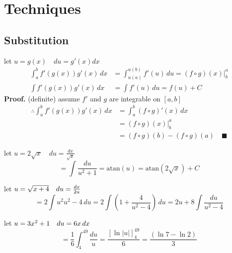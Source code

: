 \section{Techniques}
    \subsection{Substitution}
	    \begin{theorem}[usub]
			let $u=g(x)\quad du=g'(x)dx$
			\begin{align*}
				\int_a^b f'(g(x))g'(x)\,dx&=\int_{u(a)}^{u(b)}f'(u)\,du=(f\circ g)(x)\Big|_b^a\\
				\int f'(g(x))g'(x)\,dx&=\int f'(u)\,du=f(u)+C
			\end{align*}
			\textbf{Proof.} (definite) assume $f'$ and $g$ are integrable on $[a,b]$
			\begin{align*}
				\therefore\int_a^b f'(g(x))g'(x)\,dx&=\int_a^b(f\circ g)'(x)\,dx\tag*{chain rule}\\
					&=(f\circ g)(x)\Big|_b^a\tag*{FToCI}\\
					&=(f\circ g)(b)-(f\circ g)(a)\quad\blacksquare
			\end{align*}
	    \end{theorem}
		\begin{example}
			let $u=2\sqrt x\quad du=\frac{dx}{\sqrt x}$
			$$=\int\frac{du}{u^2+1}=\mathrm{atan}(u)=\mathrm{atan}(2\sqrt x)+C$$
		\end{example}
		\begin{example}
			let $u=\sqrt{x+4}\quad du=\frac{dx}{2u}\quad\color{\colo}2u\,du=dx\quad x=u^2-4$
			$$=2\int{u^2}{u^2-4}\,du=2\int\left(1+\frac4{u^2-4}\right)\,du=2u+8\int\frac{du}{u^2-4}$$
		\end{example}
		\begin{example}
			let $u=3x^2+1\quad du=6x\,dx\quad\color{\colo}u(1)=4\quad u(4)=49$
			$$=\frac16\int_4^{49}\frac{du}u=\frac{[\ln|u|]_4^{49}}6=\frac{(\ln7-\ln2)}3$$
		\end{example}
